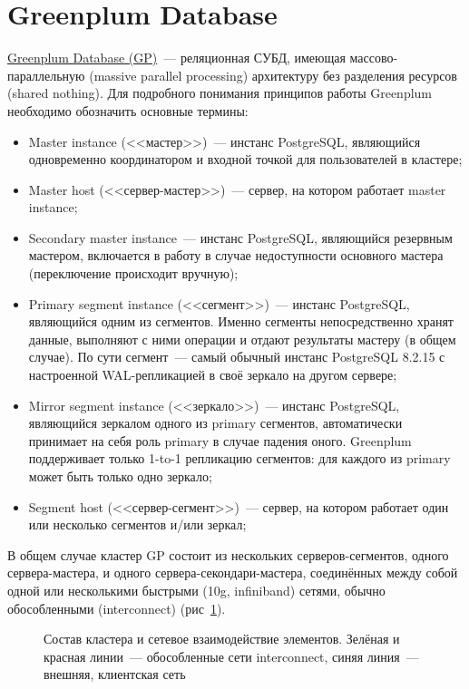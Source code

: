 \section{Greenplum Database}
\label{sec:greenplum}

\href{http://greenplum.org/}{Greenplum Database (GP)}~--- реляционная СУБД, имеющая массово-параллельную (massive parallel processing) архитектуру без разделения ресурсов (shared nothing). Для подробного понимания принципов работы Greenplum необходимо обозначить основные термины:

\begin{itemize}
  \item Master instance (<<мастер>>)~--- инстанс PostgreSQL, являющийся одновременно координатором и входной точкой для пользователей в кластере;
  \item Master host (<<сервер-мастер>>)~--- сервер, на котором работает master instance;
  \item Secondary master instance~--- инстанс PostgreSQL, являющийся резервным мастером, включается в работу в случае недоступности основного мастера (переключение происходит вручную);
  \item Primary segment instance (<<сегмент>>)~--- инстанс PostgreSQL, являющийся одним из сегментов. Именно сегменты непосредственно хранят данные, выполняют с ними операции и отдают результаты мастеру (в общем случае). По сути сегмент~--- самый обычный инстанс PostgreSQL 8.2.15 с настроенной WAL-репликацией в своё зеркало на другом сервере;
  \item Mirror segment instance (<<зеркало>>)~--- инстанс PostgreSQL, являющийся зеркалом одного из primary сегментов, автоматически принимает на себя роль primary в случае падения оного. Greenplum поддерживает только 1-to-1 репликацию сегментов: для каждого из primary может быть только одно зеркало;
  \item Segment host (<<сервер-сегмент>>)~--- сервер, на котором работает один или несколько сегментов и/или зеркал;
\end{itemize}

В общем случае кластер GP состоит из нескольких серверов-сегментов, одного сервера-мастера, и одного сервера-секондари-мастера, соединённых между собой одной или несколькими быстрыми (10g, infiniband) сетями, обычно обособленными (interconnect) (рис~\ref{fig:greenplum1}).

\begin{figure}[h!]
  \caption{Состав кластера и сетевое взаимодействие элементов. Зелёная и красная линии~--- обособленные сети interconnect, синяя линия~--- внешняя, клиентская сеть}
  \label{fig:greenplum1}
\end{figure}


